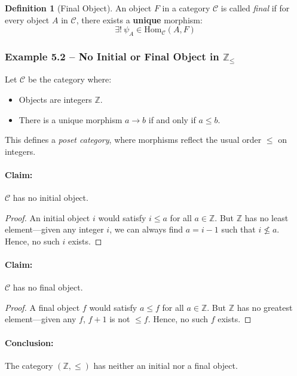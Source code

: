 \documentclass[10pt]{article}
\theoremstyle{plain}
\theoremstyle{definition}
\newtheorem{definition}{Definition}[section]
\begin{document}
  \begin{definition}[Final Object]
  	An object $F$ in a category $\mathcal{C}$ is called \emph{final} if for every object $A$ in $\mathcal{C}$, there exists a \textbf{unique} morphism:
  	\[
  	\exists! \ \psi_A \in \mathrm{Hom}_{\mathcal{C}}(A, F)
  	\]
  \end{definition}
  
  \subsubsection*{Example 5.2 – No Initial or Final Object in $\mathbb{Z}_{\le}$}
  
  Let $\mathcal{C}$ be the category where:
  \begin{itemize}
  	\item Objects are integers $\mathbb{Z}$.
  	\item There is a unique morphism $a \to b$ if and only if $a \le b$.
  \end{itemize}
  
  This defines a \emph{poset category}, where morphisms reflect the usual order $\le$ on integers.
  
  \paragraph{Claim:} $\mathcal{C}$ has no initial object.
  
  \begin{proof}
  	An initial object $i$ would satisfy $i \le a$ for all $a \in \mathbb{Z}$. But $\mathbb{Z}$ has no least element—given any integer $i$, we can always find $a = i - 1$ such that $i \nleq a$. Hence, no such $i$ exists.
  \end{proof}
  
  \paragraph{Claim:} $\mathcal{C}$ has no final object.
  
  \begin{proof}
  	A final object $f$ would satisfy $a \le f$ for all $a \in \mathbb{Z}$. But $\mathbb{Z}$ has no greatest element—given any $f$, $f + 1$ is not $\le f$. Hence, no such $f$ exists.
  \end{proof}
  
  \paragraph{Conclusion:} The category $(\mathbb{Z}, \le)$ has neither an initial nor a final object.
  
\end{document}
